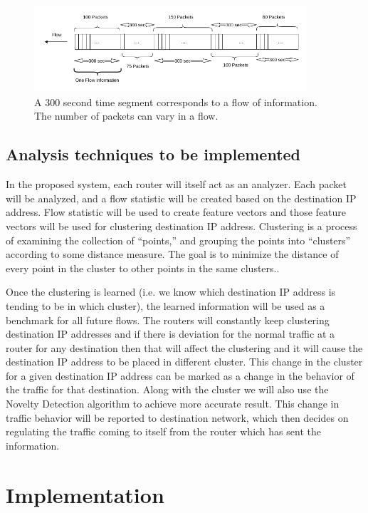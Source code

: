 \documentclass[12pt,oneside,a4paper]{article}
\begin{document}
\begin{figure}[H]
\centering
\includegraphics[width=0.90\textwidth]{Data_Flow_Capture.png}
\caption{A 300 second time segment corresponds to a flow of information. The number of packets can vary in a flow.} \label{fig:flow}
\end{figure}

\subsection{Analysis techniques to be implemented}
In the proposed system, each router will itself act as an analyzer. Each packet will be analyzed, and a flow statistic will be created based on the destination IP address. Flow statistic will be used to create feature vectors and those feature vectors will be used for clustering destination IP address. Clustering is a process of examining the collection of “points,” and grouping the points into “clusters” according to some distance measure. The goal is to minimize the distance of every point in the cluster to other points in the same clusters.\cite{machine-learning}.

Once the clustering is learned (i.e. we know which destination IP address is tending to be in which cluster), the learned information will be used as a benchmark for all future flows. The routers will constantly keep clustering destination IP addresses and if there is deviation for the normal traffic at a router for any destination then that will affect the clustering and it will cause the destination IP address to be placed in different cluster. This change in the cluster for a given destination IP address can be marked as a change in the behavior of the traffic for that destination. Along with the cluster we will also use the Novelty Detection algorithm to achieve more accurate result. This change in traffic behavior will be reported to destination network, which then decides on regulating the traffic coming to itself from the router which has sent the information.

\section{Implementation} \label{sec:Implementation}
\end{document}
